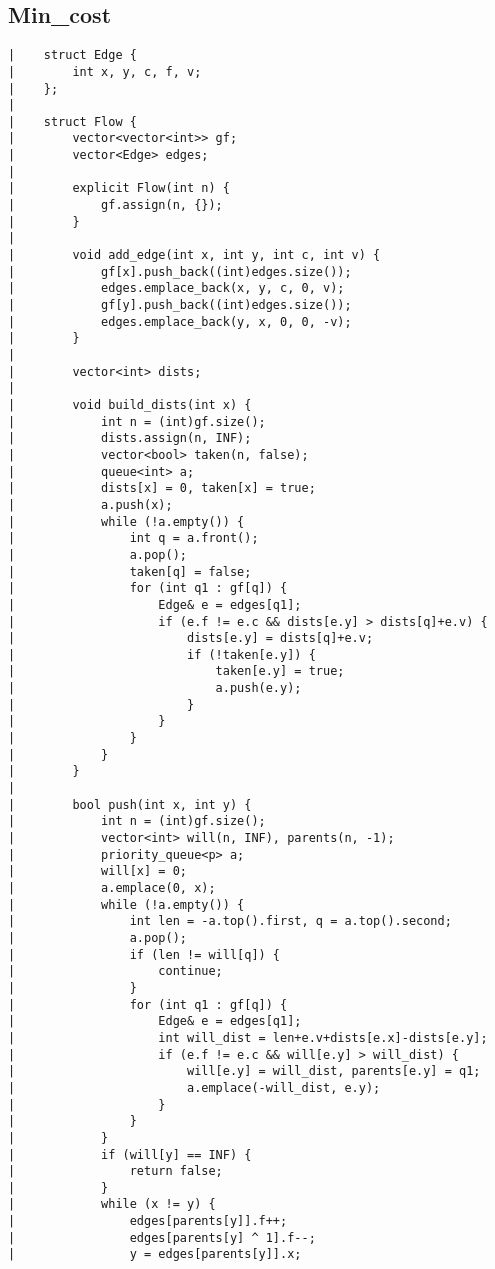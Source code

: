 \documentclass[a4paper, 10pt]{article}
\begin{document}
\begin{center}
\section*{Min\_cost}
\begin{verbatim}
|    struct Edge {
|        int x, y, c, f, v;
|    };
|    
|    struct Flow {
|        vector<vector<int>> gf;
|        vector<Edge> edges;
|    
|        explicit Flow(int n) {
|            gf.assign(n, {});
|        }
|    
|        void add_edge(int x, int y, int c, int v) {
|            gf[x].push_back((int)edges.size());
|            edges.emplace_back(x, y, c, 0, v);
|            gf[y].push_back((int)edges.size());
|            edges.emplace_back(y, x, 0, 0, -v);
|        }
|    
|        vector<int> dists;
|    
|        void build_dists(int x) {
|            int n = (int)gf.size();
|            dists.assign(n, INF);
|            vector<bool> taken(n, false);
|            queue<int> a;
|            dists[x] = 0, taken[x] = true;
|            a.push(x);
|            while (!a.empty()) {
|                int q = a.front();
|                a.pop();
|                taken[q] = false;
|                for (int q1 : gf[q]) {
|                    Edge& e = edges[q1];
|                    if (e.f != e.c && dists[e.y] > dists[q]+e.v) {
|                        dists[e.y] = dists[q]+e.v;
|                        if (!taken[e.y]) {
|                            taken[e.y] = true;
|                            a.push(e.y);
|                        }
|                    }
|                }
|            }
|        }
|    
|        bool push(int x, int y) {
|            int n = (int)gf.size();
|            vector<int> will(n, INF), parents(n, -1);
|            priority_queue<p> a;
|            will[x] = 0;
|            a.emplace(0, x);
|            while (!a.empty()) {
|                int len = -a.top().first, q = a.top().second;
|                a.pop();
|                if (len != will[q]) {
|                    continue;
|                }
|                for (int q1 : gf[q]) {
|                    Edge& e = edges[q1];
|                    int will_dist = len+e.v+dists[e.x]-dists[e.y];
|                    if (e.f != e.c && will[e.y] > will_dist) {
|                        will[e.y] = will_dist, parents[e.y] = q1;
|                        a.emplace(-will_dist, e.y);
|                    }
|                }
|            }
|            if (will[y] == INF) {
|                return false;
|            }
|            while (x != y) {
|                edges[parents[y]].f++;
|                edges[parents[y] ^ 1].f--;
|                y = edges[parents[y]].x;

\end{verbatim}
\end{center}
\end{document}
